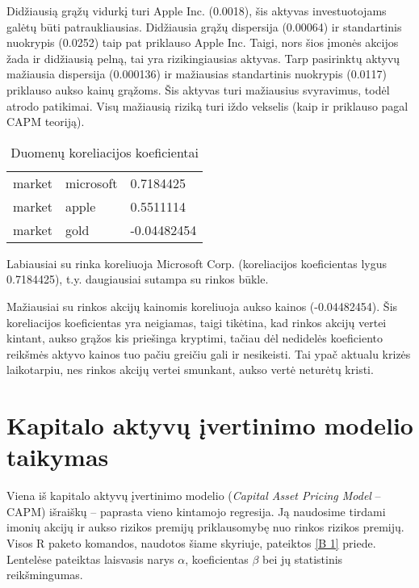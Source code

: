 \documentclass[12pt, a14paper, lithuanian]{article}
\begin{document}
Didžiausią grąžų vidurkį turi Apple Inc. (0.0018), šis aktyvas investuotojams galėtų būti  patraukliausias.
Didžiausia grąžų dispersija (0.00064) ir standartinis nuokrypis (0.0252) taip pat priklauso Apple Inc. Taigi, nors šios įmonės akcijos žada ir didžiausią pelną, tai yra rizikingiausias aktyvas.
Tarp pasirinktų aktyvų mažiausia dispersija (0.000136) ir mažiausias standartinis nuokrypis (0.0117) priklauso aukso kainų grąžoms. Šis aktyvas turi mažiausius svyravimus, todėl atrodo patikimai. Visų mažiausią riziką turi iždo vekselis (kaip ir priklauso pagal CAPM teoriją).


\begin{table}[ht]
\begin{center}
    \begin{tabular}{ | l | l | l | }
    \hline
    market & microsoft & 0.7184425 \\
  market & apple & 0.5511114 \\
  market & gold & -0.04482454 \\
	\hline
    \end{tabular}
\end{center}
\caption{Duomenų koreliacijos koeficientai}
\end{table}


Labiausiai su rinka koreliuoja Microsoft Corp. (koreliacijos koeficientas lygus 0.7184425), t.y. daugiausiai sutampa su rinkos būkle.

Mažiausiai su rinkos akcijų kainomis koreliuoja aukso kainos (-0.04482454). Šis koreliacijos koeficientas yra neigiamas, taigi tikėtina, kad rinkos akcijų vertei kintant, aukso grąžos kis priešinga kryptimi, tačiau dėl nedidelės koeficiento reikšmės aktyvo kainos tuo pačiu greičiu gali ir nesikeisti. Tai ypač aktualu krizės laikotarpiu, nes rinkos akcijų vertei smunkant, aukso vertė neturėtų kristi.



\newpage
\section{Kapitalo aktyvų įvertinimo modelio taikymas}

Viena iš kapitalo aktyvų įvertinimo modelio (\textit{Capital Asset Pricing Model} -- CAPM) išraiškų -- paprasta vieno kintamojo regresija. Ją naudosime tirdami imonių akcijų ir aukso rizikos premijų priklausomybę nuo rinkos rizikos premijų. Visos R paketo komandos, naudotos šiame skyriuje, pateiktos \ref{B 1} priede.
Lentelėse pateiktas laisvasis narys $ \alpha $, koeficientas  $ \beta $ bei jų statistinis reikšmingumas.\\
\end{document}
